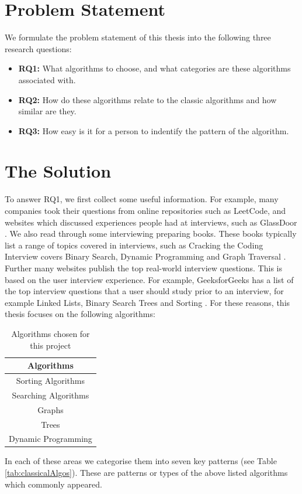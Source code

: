 \documentclass[10pt,twocolumn,hidelinks]{IEEEtran}
\begin{document}
\section{Problem Statement}
\label{label:problemstmt}
We formulate the problem statement of this thesis into the following three research questions:
\begin{itemize}
\item \textbf{RQ1: }What algorithms to choose, and what categories are these algorithms associated with. 
\item \textbf{RQ2: }How do these algorithms relate to the classic algorithms and how similar are they.
\item \textbf{RQ3: }How easy is it for a person to indentify the pattern of the algorithm.
\end{itemize}

\section{The Solution}
To answer RQ1, we first collect some useful information. For example, many companies took their questions from online repositories such as LeetCode, and websites which discussed experiences people had at interviews, such as GlassDoor \cite{glassdoor}. We also read through some interviewing preparing books. These books typically list a range of topics covered in interviews, such as Cracking the Coding Interview covers Binary Search, Dynamic Programming and Graph Traversal \cite{mcdowell2015cracking}. Further many websites publish the top real-world interview questions. This is based on the user interview experience. For example, GeeksforGeeks has a list of the top interview questions that a user should study prior to an interview, for example Linked Lists, Binary Search Trees and Sorting \cite{geeksalgos}. For these reasons, this thesis focuses on the following algorithms:

\begin{table}[h]
\centering
	\begin{tabular}{| c | } \hline
		   Algorithms \\ \hline
		Sorting Algorithms\\ \hline
		Searching Algorithms\\ \hline
		Graphs  \\ \hline
		Trees  \\ \hline
		Dynamic Programming \\ \hline
	\end{tabular}
	\caption{Algorithms chosen for this project}
	\label{tab:fiveareas}
\end{table}
In each of these areas we categorise them into seven key patterns (see Table \ref{tab:classicalAlgos}). These are patterns or types of the above listed algorithms which commonly appeared.
 
\end{document}
